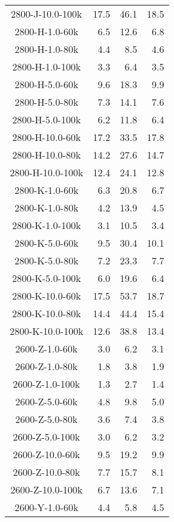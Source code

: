 \begin{longtable}{crrr}
    2800-J-10.0-100k &   17.5 &   46.1 &   18.5 \\
    2800-H-1.0-60k   &    6.5 &   12.6 &    6.8 \\
    2800-H-1.0-80k   &    4.4 &    8.5 &    4.6 \\
    2800-H-1.0-100k  &    3.3 &    6.4 &    3.5 \\
    2800-H-5.0-60k   &    9.6 &   18.3 &    9.9 \\
    2800-H-5.0-80k   &    7.3 &   14.1 &    7.6 \\
    2800-H-5.0-100k  &    6.2 &   11.8 &    6.4 \\
    2800-H-10.0-60k  &   17.2 &   33.5 &   17.8 \\
    2800-H-10.0-80k  &   14.2 &   27.6 &   14.7 \\
    2800-H-10.0-100k &   12.4 &   24.1 &   12.8 \\
    2800-K-1.0-60k   &    6.3 &   20.8 &    6.7 \\
    2800-K-1.0-80k   &    4.2 &   13.9 &    4.5 \\
    2800-K-1.0-100k  &    3.1 &   10.5 &    3.4 \\
    2800-K-5.0-60k   &    9.5 &   30.4 &   10.1 \\
    2800-K-5.0-80k   &    7.2 &   23.3 &    7.7 \\
    2800-K-5.0-100k  &    6.0 &   19.6 &    6.4 \\
    2800-K-10.0-60k  &   17.5 &   53.7 &   18.7 \\
    2800-K-10.0-80k  &   14.4 &   44.4 &   15.4 \\
    2800-K-10.0-100k &   12.6 &   38.8 &   13.4 \\
    2600-Z-1.0-60k   &    3.0 &    6.2 &    3.1 \\
    2600-Z-1.0-80k   &    1.8 &    3.8 &    1.9 \\
    2600-Z-1.0-100k  &    1.3 &    2.7 &    1.4 \\
    2600-Z-5.0-60k   &    4.8 &    9.8 &    5.0 \\
    2600-Z-5.0-80k   &    3.6 &    7.4 &    3.8 \\
    2600-Z-5.0-100k  &    3.0 &    6.2 &    3.2 \\
    2600-Z-10.0-60k  &    9.5 &   19.2 &    9.9 \\
    2600-Z-10.0-80k  &    7.7 &   15.7 &    8.1 \\
    2600-Z-10.0-100k &    6.7 &   13.6 &    7.1 \\
    2600-Y-1.0-60k   &    4.4 &    5.8 &    4.5 \\

\end{longtable}
